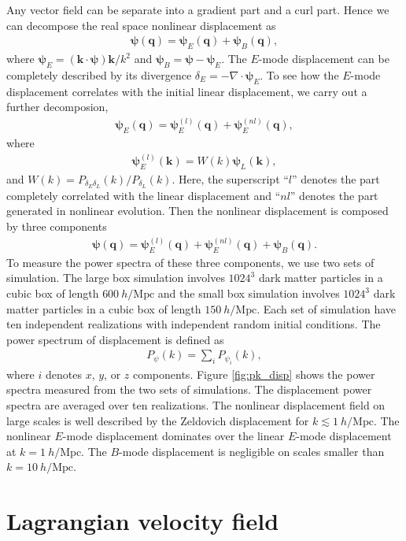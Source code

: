 \documentclass[aps,prx,twocolumn,superscriptaddress,groupedaddress,nofootinbib,amsfont]{revtex4}  %
\newcommand{\mr}{\mathrm}
\newcommand{\bea}{\begin{eqnarray}}
\newcommand{\eea}{\end{eqnarray}}
\newcommand{\bmp}{\bm{\psi}}
\newcommand{\bmk}{\bm{k}}
\newcommand{\bmq}{\bm{q}}
\begin{document}
Any vector field can be separate into a gradient part and a curl part. 
Hence we can decompose the real space nonlinear displacement as
\bea
\bmp(\bmq)=\bmp_E(\bmq)+\bmp_B(\bmq),
\eea
where $\bmp_E=(\bmk\cdot\bmp)\bmk/k^2$ and $\bmp_B=\bmp-\bmp_E$.
The $E$-mode displacement can be completely described by its divergence 
$\delta_E=-\nabla\cdot\bmp_E$. 
To see how the $E$-mode displacement correlates with the initial linear 
displacement, we carry out a further decomposion,
\bea
\bmp_E(\bmq)=\bmp_E^{(l)}(\bmq)+\bmp_E^{(nl)}(\bmq),
\eea
where
\bea
\bmp_E^{(l)}(\bmk)=W(k)\bmp_L(\bmk),
\eea
and $W(k)={P_{\delta_E\delta_L}(k)}/{P_{\delta_L}(k)}$.
Here, the superscript ``$l$'' denotes the part completely correlated with the 
linear displacement and ``$nl$'' denotes the part generated in nonlinear 
evolution.
Then the nonlinear displacement is composed by three components
\bea
\bmp(\bmq)=\bmp^{(l)}_E(\bmq)+\bmp^{(nl)}_E(\bmq)+\bmp_B(\bmq).
\eea
To measure the power spectra of these three components, we use two sets of simulation. The large box simulation involves $1024^3$ dark matter particles in a 
cubic box of length $600\ h/\mr{Mpc}$ and the small box simulation involves
$1024^3$ dark matter particles in a cubic box of length $150\ h/\mr{Mpc}$.
Each set of simulation have ten independent realizations with independent random
initial conditions.
The power spectrum of displacement is defined as 
\bea
P_\psi(k)=\sum_iP_{\psi_i}(k),
\eea
where $i$ denotes $x$, $y$, or $z$ components.
Figure \ref{fig:pk_disp} shows the power spectra measured from the two sets of
simulations. The displacement power spectra are averaged over ten realizations.
The nonlinear displacement field on large scales is well described by the 
Zeldovich displacement for $k\lesssim1\ h/\mr{Mpc}$.
The nonlinear $E$-mode displacement dominates over the linear $E$-mode displacement at $k=1\ h/\mr{Mpc}$. The $B$-mode displacement is negligible on scales 
smaller than $k=10\ h/\mr{Mpc}$.


\section{Lagrangian velocity field}
\label{appendix:B}
\end{document}
